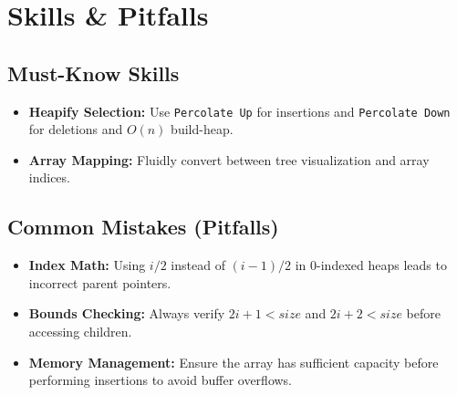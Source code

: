 \section{Skills \& Pitfalls}

\subsection{Must-Know Skills}
\begin{itemize}
    \item \textbf{Heapify Selection:} Use \texttt{Percolate Up} for insertions and \texttt{Percolate Down} for deletions and $O(n)$ build-heap.
    \item \textbf{Array Mapping:} Fluidly convert between tree visualization and array indices.
\end{itemize}

\subsection{Common Mistakes (Pitfalls)}
\begin{remark}
\begin{itemize}
    \item \textbf{Index Math:} Using $i/2$ instead of $(i-1)/2$ in 0-indexed heaps leads to incorrect parent pointers.
    \item \textbf{Bounds Checking:} Always verify $2i+1 < size$ and $2i+2 < size$ before accessing children.
    \item \textbf{Memory Management:} Ensure the array has sufficient capacity before performing insertions to avoid buffer overflows.
\end{itemize}
\end{remark}
